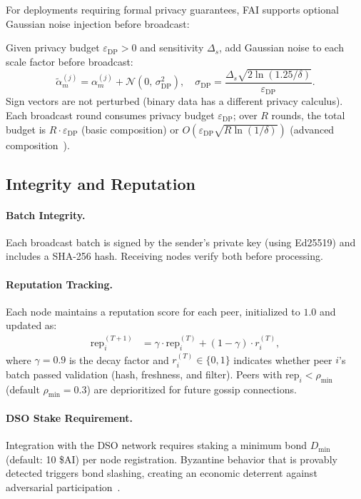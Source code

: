 For deployments requiring formal privacy guarantees, FAI supports optional
Gaussian noise injection before broadcast:

\begin{definition}
\label{def:dp-noise}
Given privacy budget $\varepsilon_{\text{DP}} > 0$ and sensitivity $\Delta_s$,
add Gaussian noise to each scale factor before broadcast:
\begin{equation}
    \tilde{\alpha}_m^{(j)} = \alpha_m^{(j)} + \mathcal{N}\!\left(0, \, \sigma_{\text{DP}}^2\right),
    \quad \sigma_{\text{DP}} = \frac{\Delta_s \sqrt{2 \ln(1.25/\delta)}}{\varepsilon_{\text{DP}}}.
\end{equation}
Sign vectors are not perturbed (binary data has a different privacy calculus).
Each broadcast round consumes privacy budget $\varepsilon_{\text{DP}}$;
over $R$ rounds, the total budget is $R \cdot \varepsilon_{\text{DP}}$ (basic
composition) or $O(\varepsilon_{\text{DP}} \sqrt{R \ln(1/\delta)})$ (advanced
composition~\cite{dwork2014algorithmic}).
\end{definition}

\subsection{Integrity and Reputation}

\paragraph{Batch Integrity.}
Each broadcast batch is signed by the sender's private key (using Ed25519)
and includes a SHA-256 hash. Receiving nodes verify both before processing.

\paragraph{Reputation Tracking.}
Each node maintains a reputation score for each peer, initialized to $1.0$
and updated as:
\begin{align}
    \text{rep}^{(T+1)}_i &= \gamma \cdot \text{rep}^{(T)}_i + (1 - \gamma) \cdot r_i^{(T)},
    \label{eq:reputation}
\end{align}
where $\gamma = 0.9$ is the decay factor and $r_i^{(T)} \in \{0, 1\}$
indicates whether peer $i$'s batch passed validation (hash, freshness, and
filter). Peers with $\text{rep}_i < \rho_{\min}$ (default $\rho_{\min} = 0.3$)
are deprioritized for future gossip connections.

\paragraph{DSO Stake Requirement.}
Integration with the DSO network requires staking a minimum bond $D_{\min}$
(default: 10 \$AI) per node registration. Byzantine behavior that is
provably detected triggers bond slashing, creating an economic deterrent
against adversarial participation~\cite{hanzo2026dso}.

